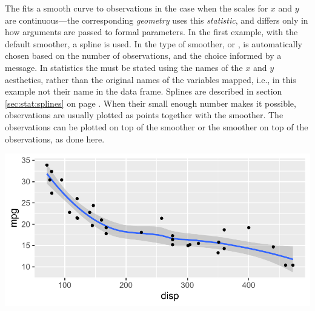 \documentclass[krantz2]{krantz}\usepackage{knitr}
\begin{document}
The   fits a smooth curve to observations in the case when the scales for $x$ and $y$ are continuous---the corresponding \emph{geometry}  uses this \emph{statistic}, and differs only in how arguments are passed to formal parameters. In the first example,  with the default smoother, a spline is used. In  the type of smoother, or , is automatically chosen based on the number of observations, and the choice informed by a message. In statistics the  must be stated using the names of the $x$ and $y$ aesthetics, rather than the original names of the variables mapped, i.e., in this example not their name in the  data frame. Splines are described in section \ref{sec:stat:splines} on page \pageref{sec:stat:splines}. When their small enough number makes it possible, observations are usually plotted as points together with the smoother. The observations can be plotted on top of the smoother or the smoother on top of the observations, as done here.

\begin{knitrout}\footnotesize
{}\color{fgcolor}\begin{kframe}
\begin{alltt}
 \hlkwb{<-}
  \hlstd{(}   \hlstd{=} \hlstd{(}    \hlopt{+}
  \hlstd{()}
\end{alltt}
\end{kframe}
\end{knitrout}

\begin{knitrout}\footnotesize
{}\color{fgcolor}\begin{kframe}
\begin{alltt}
 \hlopt{+} \hlstd{(} \hlstd{=} \hlstd{,}   \hlopt{~} 
\end{alltt}
\end{kframe}

{\centering \includegraphics[width=.7\textwidth]{figure/pos-smooth-plot-02-1} 

}


\end{knitrout}
\end{document}
